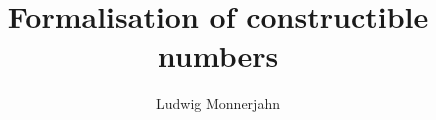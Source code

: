 \documentclass[12pt]{article}
\title{Formalisation of constructible numbers}
\author{Ludwig Monnerjahn}
\theoremstyle{definition}
\theoremstyle{remark}
\begin{document}
\maketitle










\nocite{*}
\end{document}
